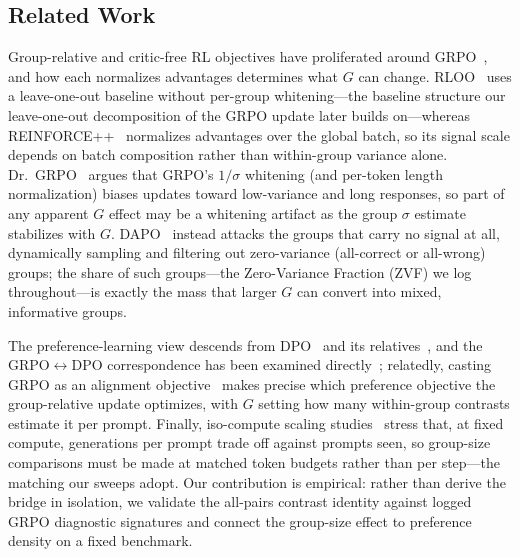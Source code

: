 \subsection{Related Work}
\label{sec:p3-related}
Group-relative and critic-free RL objectives have proliferated around
GRPO~\citep{ahmadian2024backtobasics, lin2025cppo, shao2024deepseekmath, gift2025},
and how each normalizes advantages determines what $G$ can change. RLOO~\citep{ahmadian2024backtobasics}
uses a leave-one-out baseline without per-group whitening---the baseline structure
our leave-one-out decomposition of the GRPO update later builds on---whereas
REINFORCE++~\citep{hu2025reinforcepp} normalizes advantages over the global batch,
so its signal scale depends on batch composition rather than within-group variance
alone. Dr.~GRPO~\citep{tong2025drgrpo} argues that GRPO's $1/\sigma$ whitening (and
per-token length normalization) biases updates toward low-variance and long
responses, so part of any apparent $G$ effect may be a whitening artifact as the
group $\sigma$ estimate stabilizes with $G$. DAPO~\citep{yu2025dapo} instead attacks
the groups that carry no signal at all, dynamically sampling and filtering out
zero-variance (all-correct or all-wrong) groups; the share of such groups---the
Zero-Variance Fraction (ZVF) we log throughout---is exactly the mass that larger
$G$ can convert into mixed, informative groups.

The preference-learning view descends from
DPO~\citep{rafailov2024direct} and its relatives~\citep{azar2024ipo, ethayarajh2024kto, hong2024orpo},
and the GRPO$\leftrightarrow$DPO correspondence has been examined
directly~\citep{wu2025grpodpo}; relatedly, casting GRPO as an alignment
objective~\citep{vojnovic2025grpo} makes precise which preference objective the
group-relative update optimizes, with $G$ setting how many within-group contrasts
estimate it per prompt. Finally, iso-compute scaling studies~\citep{tan2025scalingrl, cheng2026isocompute}
stress that, at fixed compute, generations per prompt trade off against prompts
seen, so group-size comparisons must be made at matched token budgets rather than
per step---the matching our sweeps adopt. Our contribution is empirical: rather
than derive the bridge in isolation, we validate the all-pairs contrast identity
against logged GRPO diagnostic signatures and connect the group-size effect to preference
density on a fixed benchmark.
